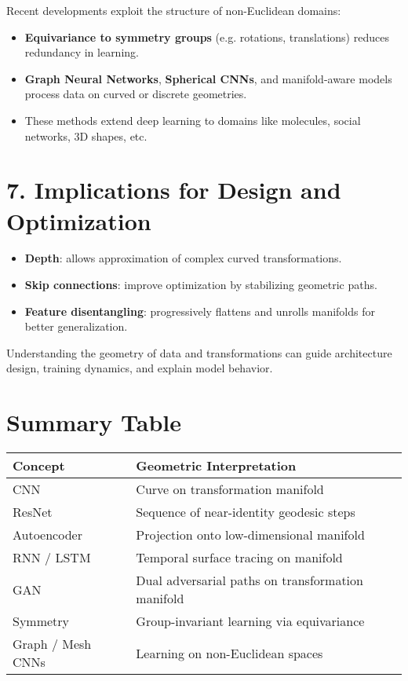 \documentclass[a4paper,11pt]{article}
\begin{document}
Recent developments exploit the structure of non-Euclidean domains:

\begin{itemize}
    \item \textbf{Equivariance to symmetry groups} (e.g. rotations, translations) reduces redundancy in learning.
    \item \textbf{Graph Neural Networks}, \textbf{Spherical CNNs}, and manifold-aware models process data on curved or discrete geometries.
    \item These methods extend deep learning to domains like molecules, social networks, 3D shapes, etc.
\end{itemize}

\section*{7. Implications for Design and Optimization}

\begin{itemize}
    \item \textbf{Depth}: allows approximation of complex curved transformations.
    \item \textbf{Skip connections}: improve optimization by stabilizing geometric paths.
    \item \textbf{Feature disentangling}: progressively flattens and unrolls manifolds for better generalization.
\end{itemize}

Understanding the geometry of data and transformations can guide architecture design, training dynamics, and explain model behavior.

\section*{Summary Table}

\begin{center}
\begin{tabular}{|l|l|}
\hline
\textbf{Concept} & \textbf{Geometric Interpretation} \\
\hline
CNN & Curve on transformation manifold \\
ResNet & Sequence of near-identity geodesic steps \\
Autoencoder & Projection onto low-dimensional manifold \\
RNN / LSTM & Temporal surface tracing on manifold \\
GAN & Dual adversarial paths on transformation manifold \\
Symmetry & Group-invariant learning via equivariance \\
Graph / Mesh CNNs & Learning on non-Euclidean spaces \\
\hline
\end{tabular}
\end{center}
\end{document}
